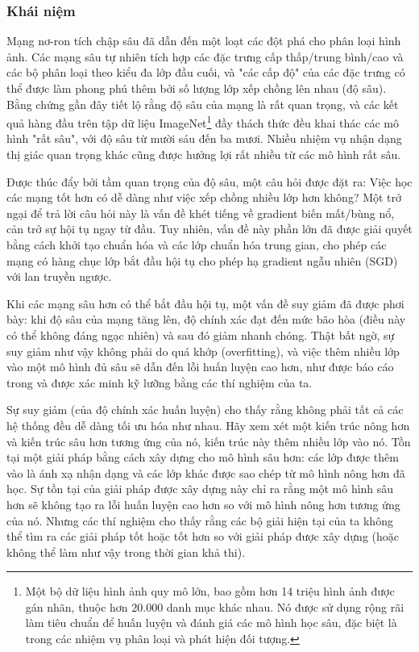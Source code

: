 \documentclass[../main.tex]{subfiles}
\begin{document}
\subsubsection*{Khái niệm}

Mạng nơ-ron tích chập sâu đã dẫn đến một loạt các đột phá cho phân loại hình ảnh. Các mạng sâu tự nhiên tích hợp các đặc trưng cấp thấp/trung bình/cao và các bộ phân loại theo kiểu đa lớp đầu cuối, và "các cấp độ" của các đặc trưng có thể được làm phong phú thêm bởi số lượng lớp xếp chồng lên nhau (độ sâu). Bằng chứng gần đây tiết lộ rằng độ sâu của mạng là rất quan trọng, và các kết quả hàng đầu trên tập dữ liệu ImageNet\footnote{Một bộ dữ liệu hình ảnh quy mô lớn, bao gồm hơn 14 triệu hình ảnh được gán nhãn, thuộc hơn 20.000 danh mục khác nhau. Nó được sử dụng rộng rãi làm tiêu chuẩn để huấn luyện và đánh giá các mô hình học sâu, đặc biệt là trong các nhiệm vụ phân loại và phát hiện đối tượng.} đầy thách thức đều khai thác các mô hình "rất sâu", với độ sâu từ mười sáu đến ba mươi. Nhiều nhiệm vụ nhận dạng thị giác quan trọng khác cũng được hưởng lợi rất nhiều từ các mô hình rất sâu.

Được thúc đẩy bởi tầm quan trọng của độ sâu, một câu hỏi được đặt ra: Việc học các mạng tốt hơn có dễ dàng như việc xếp chồng nhiều lớp hơn không? Một trở ngại để trả lời câu hỏi này là vấn đề khét tiếng về gradient biến mất/bùng nổ, cản trở sự hội tụ ngay từ đầu. Tuy nhiên, vấn đề này phần lớn đã được giải quyết bằng cách khởi tạo chuẩn hóa và các lớp chuẩn hóa trung gian, cho phép các mạng có hàng chục lớp bắt đầu hội tụ cho phép hạ gradient ngẫu nhiên (SGD) với lan truyền ngược.

Khi các mạng sâu hơn có thể bắt đầu hội tụ, một vấn đề suy giảm đã được phơi bày: khi độ sâu của mạng tăng lên, độ chính xác đạt đến mức bão hòa (điều này có thể không đáng ngạc nhiên) và sau đó giảm nhanh chóng. Thật bất ngờ, sự suy giảm như vậy không phải do quá khớp (overfitting), và việc thêm nhiều lớp vào một mô hình đủ sâu sẽ dẫn đến lỗi huấn luyện cao hơn, như được báo cáo trong và được xác minh kỹ lưỡng bằng các thí nghiệm của ta.

Sự suy giảm (của độ chính xác huấn luyện) cho thấy rằng không phải tất cả các hệ thống đều dễ dàng tối ưu hóa như nhau. Hãy xem xét một kiến trúc nông hơn và kiến trúc sâu hơn tương ứng của nó, kiến trúc này thêm nhiều lớp vào nó. Tồn tại một giải pháp bằng cách xây dựng cho mô hình sâu hơn: các lớp được thêm vào là ánh xạ nhận dạng và các lớp khác được sao chép từ mô hình nông hơn đã học. Sự tồn tại của giải pháp được xây dựng này chỉ ra rằng một mô hình sâu hơn sẽ không tạo ra lỗi huấn luyện cao hơn so với mô hình nông hơn tương ứng của nó. Nhưng các thí nghiệm cho thấy rằng các bộ giải hiện tại của ta không thể tìm ra các giải pháp tốt hoặc tốt hơn so với giải pháp được xây dựng (hoặc không thể làm như vậy trong thời gian khả thi).
\end{document}
